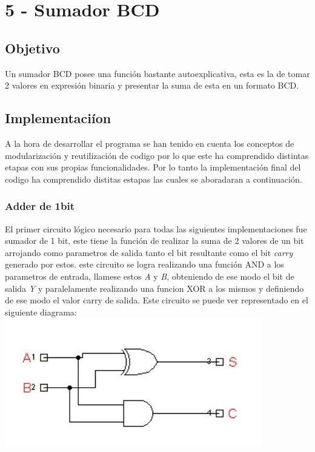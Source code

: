\chapter*{5 - Sumador BCD}
\section{Objetivo}
  Un sumador BCD posee una funci\'on bastante autoexplicativa, esta es la de tomar 2 valores en expresi\'on binaria y presentar la suma de esta en un formato BCD.
  \section{Implementaci\'ion}
  A la hora de desarrollar el programa se han tenido en cuenta los conceptos de modularizaci\'on y reutilizaci\'on de codigo por lo que este ha comprendido distintas etapas con sus propias funcionalidades. Por lo tanto la implementaci\'on final del codigo ha comprendido distitas estapas las cuales se aboradaran a continuaci\'on.
  \subsection{Adder de 1bit}
  El primer circuito l\'ogico necesario para todas las siguientes implementaciones fue sumador de 1 bit, este tiene la funci\'on de realizar la suma de 2 valores de un bit arrojando como parametros de salida tanto el bit resultante como el bit \emph{carry} generado por estos. este circuito se logra realizando una funci\'on AND a los parametros de entrada, llamese estos \emph{A} y \emph{B}, obteniendo de ese modo el bit de salida \emph{Y} y paralelamente realizando una funcion XOR a los mismos y definiendo de ese modo el valor carry de salida. Este circuito se puede ver representado en el siguiente diagrama:
\includegraphics[width=\textwidth]{Ejercicios/adder.jpg}
